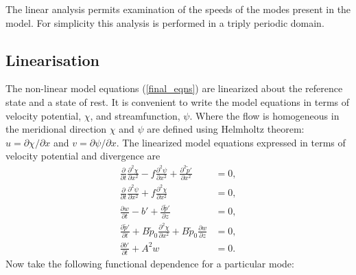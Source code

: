 \documentclass[times]{qjrms4}
\begin{document}
The linear analysis permits examination of the speeds of the modes present in the model. 
For simplicity this analysis is performed in a triply periodic domain.

\subsection{Linearisation}
The non-linear model equations (\ref{final_eqns}) are linearized about the reference state and a 
state of rest.    
It is convenient to write the model equations in terms of velocity potential, $\chi$, and 
streamfunction, $\psi$. Where the flow is homogeneous in the meridional direction $\chi$ and $\psi$ 
are defined using Helmholtz theorem:
$u =  {\partial \chi}/{\partial x}$ and $v =   {\partial \psi }/{\partial x}$.
The linearized model equations expressed in terms of velocity potential and divergence are
%
\begin{subequations} \label{linear_eqns}
\begin{align} 
\frac{\partial}{\partial t}  \frac{\partial^2 \chi}{\partial x^2} -
 f \frac{\partial^2 \psi}{\partial x^2} + \frac{\partial^2 \tilde{p}'}{\partial x^2} &=0, \label{ucoup}\\
\frac{\partial}{\partial t} \frac{\partial^2 \psi}{\partial x^2} +
 f\frac{\partial^2 \chi}{\partial x^2}  &=0,\label{vcoup} \\
\frac{\partial w}{\partial t} - b' + \frac{\partial \tilde{p}'}{\partial z} &= 0, \label{wcoup}\\
\frac {\partial \tilde{p}'}{\partial t} + B \tilde{p}_0 \frac{\partial^2 \chi}{\partial x^2} +
 B \tilde{p}_0 \frac{\partial w}{\partial z} &= 0, \label{rhocoup}\\
\frac {\partial b'}{\partial t} + A^2w &= 0. \label{bcoup}  
\end{align} 
\end{subequations}
%
Now take the following functional dependence for a particular mode:
\end{document}
